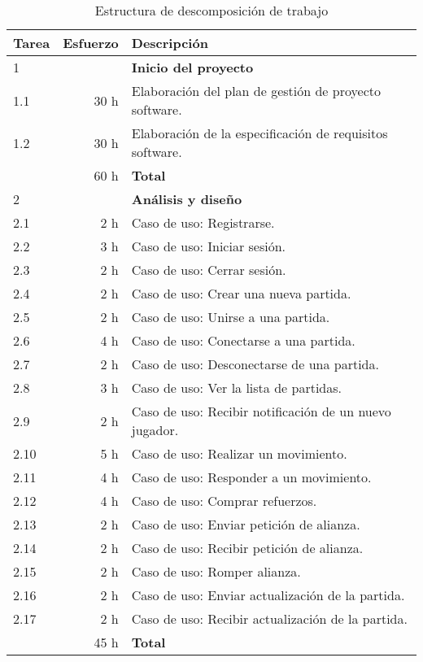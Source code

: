 {\footnotesize
\begin{longtable}[c]{lrl}
\caption{Estructura de descomposición de trabajo} \\

\textbf{Tarea}&\textbf{Esfuerzo} & \textbf{Descripción} \\
\hline \hline
\endhead

1 & & \textbf{Inicio del proyecto} \\
1.1 & 30 h & Elaboración del plan de gestión de proyecto software. \\
1.2 & 30 h & Elaboración de la especificación de requisitos software. \\
    & 60 h & \textbf{Total} \\
\hline

2 & & \textbf{Análisis y diseño} \\
2.1  & 2 h & Caso de uso: Registrarse. \\
2.2  & 3 h & Caso de uso: Iniciar sesión. \\
2.3  & 2 h & Caso de uso: Cerrar sesión. \\
2.4  & 2 h & Caso de uso: Crear una nueva partida. \\
2.5  & 2 h & Caso de uso: Unirse a una partida. \\
2.6  & 4 h & Caso de uso: Conectarse a una partida. \\
2.7  & 2 h & Caso de uso: Desconectarse de una partida. \\
2.8  & 3 h & Caso de uso: Ver la lista de partidas. \\
2.9  & 2 h & Caso de uso: Recibir notificación de un nuevo jugador. \\
2.10 & 5 h & Caso de uso: Realizar un movimiento. \\
2.11 & 4 h & Caso de uso: Responder a un movimiento. \\
2.12 & 4 h & Caso de uso: Comprar refuerzos. \\
2.13 & 2 h & Caso de uso: Enviar petición de alianza. \\
2.14 & 2 h & Caso de uso: Recibir petición de alianza. \\
2.15 & 2 h & Caso de uso: Romper alianza. \\
2.16 & 2 h & Caso de uso: Enviar actualización de la partida. \\
2.17 & 2 h & Caso de uso: Recibir actualización de la partida. \\
    & 45 h & \textbf{Total} \\
\hline


\end{longtable}}
